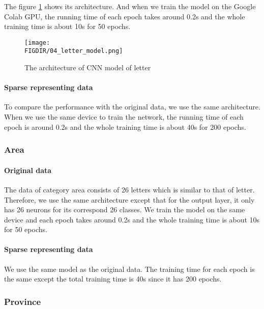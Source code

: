 The figure \ref{letter_architecture} shows its architecture. 
And when we train the model on the Google Colab GPU, 
the running time of each epoch takes around 0.2s and 
the whole training time is about 10s for 50 epochs.

\begin{figure}[ht]
\centering
\texttt{[image: \\FIGDIR/04\_letter\_model.png]}
\caption{The architecture of CNN model of letter}
\label{letter_architecture}
\end{figure}

\paragraph{Sparse representing data}
To compare the performance with the original data, we use the same architecture. 
When we use the same device to train the network, the running time of each epoch is around 0.2s 
and the whole training time is about 40s for 200 epochs.

\subsubsection{Area}
\paragraph{Original data} %
The data of category area consists of 26 letters which is similar to that of letter.
Therefore, we use the same architecture except that for the output layer, 
it only has 26 neurons for its correspond 26 classes. We train the model on the same 
device and each epoch takes around 0.2s and the whole training time is about 10s for 50 epochs.

\paragraph{Sparse representing data}
We use the same model as the original data. The training time for each epoch is the same 
except the total training time is 40s since it has 200 epochs.

\subsubsection{Province}
